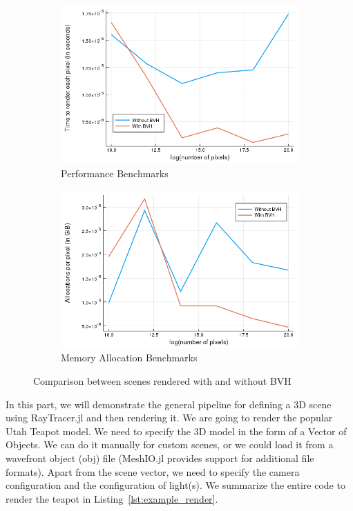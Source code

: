 \documentclass{juliacon}
\begin{document}
\begin{figure}[!htb]
    \centering
    \begin{subfigure}[c]{0.45\textwidth}
        \includegraphics[width=\textwidth]{images/performance-speed.png}
        \caption{Performance Benchmarks}
        \label{fig:bvh_perf}
    \end{subfigure}
    \hfill
    \begin{subfigure}[c]{0.45\textwidth}
        \includegraphics[width=\textwidth]{images/performance-memory.png}
        \caption{Memory Allocation Benchmarks}
        \label{fig:bvh_mem}
    \end{subfigure}
    \caption{Comparison between scenes rendered with and without BVH}
    \label{fig:bvh}
\end{figure}

In this part, we will demonstrate the general pipeline for defining a 3D scene using RayTracer.jl and then rendering it. We are going to render the popular Utah Teapot model. We need to specify the 3D model in the form of a Vector of Objects. We can do it manually for custom scenes, or we could load it from a wavefront object (obj) file (MeshIO.jl provides support for additional file formats). Apart from the scene vector, we need to specify the camera configuration and the configuration of light(s). We summarize the entire code to render the teapot in Listing~\ref{lst:example_render}.
\end{document}
